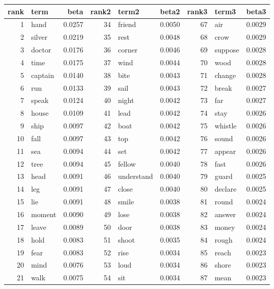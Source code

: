 \begin{table}[ht]
\centering
\begin{tabular}{rlrrlrrlr}
  \hline
rank & term & beta & rank2 & term2 & beta2 & rank3 & term3 & beta3 \\ 
  \hline
1 & hand & 0.0257 & 34 & friend & 0.0050 & 67 & air & 0.0029 \\ 
  2 & silver & 0.0219 & 35 & rest & 0.0048 & 68 & crow & 0.0029 \\ 
  3 & doctor & 0.0176 & 36 & corner & 0.0046 & 69 & suppose & 0.0028 \\ 
  4 & time & 0.0175 & 37 & wind & 0.0044 & 70 & wood & 0.0028 \\ 
  5 & captain & 0.0140 & 38 & bite & 0.0043 & 71 & change & 0.0028 \\ 
  6 & run & 0.0133 & 39 & sail & 0.0043 & 72 & break & 0.0027 \\ 
  7 & speak & 0.0124 & 40 & night & 0.0042 & 73 & far & 0.0027 \\ 
  8 & house & 0.0109 & 41 & lead & 0.0042 & 74 & stay & 0.0026 \\ 
  9 & ship & 0.0097 & 42 & boat & 0.0042 & 75 & whistle & 0.0026 \\ 
  10 & fall & 0.0097 & 43 & top & 0.0042 & 76 & sound & 0.0026 \\ 
  11 & sea & 0.0094 & 44 & set & 0.0042 & 77 & appear & 0.0026 \\ 
  12 & tree & 0.0094 & 45 & fellow & 0.0040 & 78 & fast & 0.0026 \\ 
  13 & head & 0.0091 & 46 & understand & 0.0040 & 79 & guard & 0.0025 \\ 
  14 & leg & 0.0091 & 47 & close & 0.0040 & 80 & declare & 0.0025 \\ 
  15 & lie & 0.0091 & 48 & smile & 0.0038 & 81 & round & 0.0024 \\ 
  16 & moment & 0.0090 & 49 & lose & 0.0038 & 82 & answer & 0.0024 \\ 
  17 & leave & 0.0089 & 50 & door & 0.0038 & 83 & money & 0.0024 \\ 
  18 & hold & 0.0083 & 51 & shoot & 0.0035 & 84 & rough & 0.0024 \\ 
  19 & fear & 0.0083 & 52 & rise & 0.0034 & 85 & reach & 0.0023 \\ 
  20 & mind & 0.0076 & 53 & loud & 0.0034 & 86 & shore & 0.0023 \\ 
  21 & walk & 0.0075 & 54 & sit & 0.0034 & 87 & mean & 0.0023 \\ 

\end{tabular}
\end{table}
